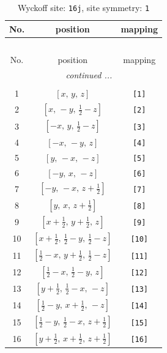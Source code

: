 \documentclass[fleqn,8pt]{jsarticle}
\begin{document}
\begin{longtable}{ccc}
\caption{Wyckoff site: {\tt 16j}, site symmetry: {\tt 1}}
 \\
 \hline \hline
No. & position & mapping \\ \hline \endfirsthead

\multicolumn{2}{l}{\tablename\ \thetable{}} \\
 \hline \hline
No. & position & mapping \\ \hline \endhead

 \hline \hline
\multicolumn{2}{r}{\footnotesize\it continued ...} \\ \endfoot

 \hline \hline
\multicolumn{2}{r}{} \\ \endlastfoot

1 & $\left[ x,\, y,\, z \right]$ & {\tt [1]} \\ \hline
2 & $\left[ x,\, - y,\, \frac{1}{2} - z \right]$ & {\tt [2]} \\ \hline
3 & $\left[ - x,\, y,\, \frac{1}{2} - z \right]$ & {\tt [3]} \\ \hline
4 & $\left[ - x,\, - y,\, z \right]$ & {\tt [4]} \\ \hline
5 & $\left[ y,\, - x,\, - z \right]$ & {\tt [5]} \\ \hline
6 & $\left[ - y,\, x,\, - z \right]$ & {\tt [6]} \\ \hline
7 & $\left[ - y,\, - x,\, z + \frac{1}{2} \right]$ & {\tt [7]} \\ \hline
8 & $\left[ y,\, x,\, z + \frac{1}{2} \right]$ & {\tt [8]} \\ \hline
9 & $\left[ x + \frac{1}{2},\, y + \frac{1}{2},\, z \right]$ & {\tt [9]} \\ \hline
10 & $\left[ x + \frac{1}{2},\, \frac{1}{2} - y,\, \frac{1}{2} - z \right]$ & {\tt [10]} \\ \hline
11 & $\left[ \frac{1}{2} - x,\, y + \frac{1}{2},\, \frac{1}{2} - z \right]$ & {\tt [11]} \\ \hline
12 & $\left[ \frac{1}{2} - x,\, \frac{1}{2} - y,\, z \right]$ & {\tt [12]} \\ \hline
13 & $\left[ y + \frac{1}{2},\, \frac{1}{2} - x,\, - z \right]$ & {\tt [13]} \\ \hline
14 & $\left[ \frac{1}{2} - y,\, x + \frac{1}{2},\, - z \right]$ & {\tt [14]} \\ \hline
15 & $\left[ \frac{1}{2} - y,\, \frac{1}{2} - x,\, z + \frac{1}{2} \right]$ & {\tt [15]} \\ \hline
16 & $\left[ y + \frac{1}{2},\, x + \frac{1}{2},\, z + \frac{1}{2} \right]$ & {\tt [16]} \\
\end{longtable}
\end{document}
